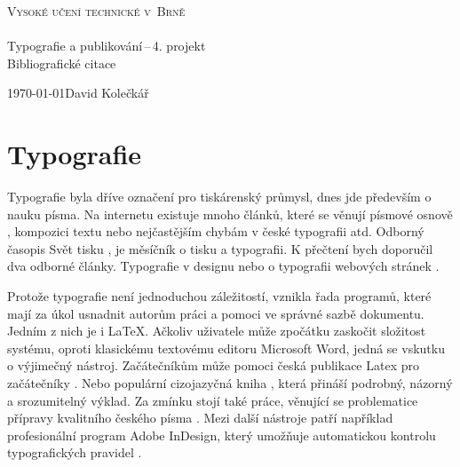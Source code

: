 \documentclass[a4paper,11pt]{article}
\begin{document}
\begin{titlepage}
\begin{center}
\fontsize{27}{20}\selectfont\textsc{{Vysoké učení technické v~Brně}}\\
\fontsize{22.7}{0}\textsc{\selectfont{Fakulta informačních technologií}}\\
\LARGE{Typografie a publikování\,--\,4. projekt}\\
\Huge{Bibliografické citace}
\end{center}
{\Large \today \hfill David Kolečkář}
\end{titlepage}

\section{Typografie}
Typografie byla dříve označení pro tiskárenský průmysl, dnes jde především o nauku písma. Na internetu existuje mnoho článků, které se věnují písmové osnově \cite{Program:pismo}, kompozici textu \cite{Typomil:kompozice} nebo nejčastějším chybám v české typografii \cite{Typ:chyby}  atd. Odborný časopis Svět tisku \cite{Tisk}, je měsíčník o tisku a typografii. K přečtení bych doporučil dva odborné články. Typografie v designu \cite{Clanek1} nebo o typografii webových stránek \cite{Clanek2}.

Protože typografie není jednoduchou záležitostí, vznikla řada programů, které mají za úkol usnadnit autorům práci a pomoci ve správné sazbě dokumentu. 
Jedním z nich je i LaTeX. Ačkoliv uživatele může zpočátku zaskočit složitost systému, oproti klasickému textovému editoru Microsoft Word, jedná se vskutku o výjimečný nástroj. 
Začátečníkům může pomoci česká publikace Latex pro začátečníky \cite{Rybicka}. Nebo populární cizojazyčná kniha \cite{Guide}, která přináší podrobný, názorný a srozumitelný výklad. 
Za zmínku stojí také práce, věnující se problematice přípravy kvalitního českého písma  \cite{Cerny}.
Mezi další nástroje patří například profesionální program Adobe InDesign, který umožňuje automatickou kontrolu typografických pravidel  \cite{Kubova}. 
\newpage

\renewcommand{\refname}{Literatura}

\end{document}

